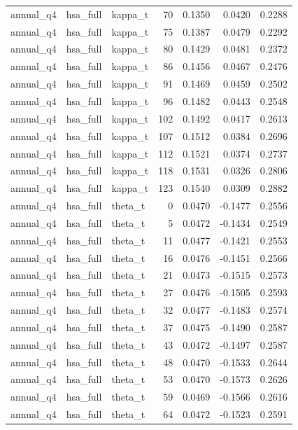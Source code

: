 \begin{tabular}{lllrrrr}
annual\_q4 & hsa\_full & kappa\_t & 70 & 0.1350 & 0.0420 & 0.2288 \\
annual\_q4 & hsa\_full & kappa\_t & 75 & 0.1387 & 0.0479 & 0.2292 \\
annual\_q4 & hsa\_full & kappa\_t & 80 & 0.1429 & 0.0481 & 0.2372 \\
annual\_q4 & hsa\_full & kappa\_t & 86 & 0.1456 & 0.0467 & 0.2476 \\
annual\_q4 & hsa\_full & kappa\_t & 91 & 0.1469 & 0.0459 & 0.2502 \\
annual\_q4 & hsa\_full & kappa\_t & 96 & 0.1482 & 0.0443 & 0.2548 \\
annual\_q4 & hsa\_full & kappa\_t & 102 & 0.1492 & 0.0417 & 0.2613 \\
annual\_q4 & hsa\_full & kappa\_t & 107 & 0.1512 & 0.0384 & 0.2696 \\
annual\_q4 & hsa\_full & kappa\_t & 112 & 0.1521 & 0.0374 & 0.2737 \\
annual\_q4 & hsa\_full & kappa\_t & 118 & 0.1531 & 0.0326 & 0.2806 \\
annual\_q4 & hsa\_full & kappa\_t & 123 & 0.1540 & 0.0309 & 0.2882 \\
annual\_q4 & hsa\_full & theta\_t & 0 & 0.0470 & -0.1477 & 0.2556 \\
annual\_q4 & hsa\_full & theta\_t & 5 & 0.0472 & -0.1434 & 0.2549 \\
annual\_q4 & hsa\_full & theta\_t & 11 & 0.0477 & -0.1421 & 0.2553 \\
annual\_q4 & hsa\_full & theta\_t & 16 & 0.0476 & -0.1451 & 0.2566 \\
annual\_q4 & hsa\_full & theta\_t & 21 & 0.0473 & -0.1515 & 0.2573 \\
annual\_q4 & hsa\_full & theta\_t & 27 & 0.0476 & -0.1505 & 0.2593 \\
annual\_q4 & hsa\_full & theta\_t & 32 & 0.0477 & -0.1483 & 0.2574 \\
annual\_q4 & hsa\_full & theta\_t & 37 & 0.0475 & -0.1490 & 0.2587 \\
annual\_q4 & hsa\_full & theta\_t & 43 & 0.0472 & -0.1497 & 0.2587 \\
annual\_q4 & hsa\_full & theta\_t & 48 & 0.0470 & -0.1533 & 0.2644 \\
annual\_q4 & hsa\_full & theta\_t & 53 & 0.0470 & -0.1573 & 0.2626 \\
annual\_q4 & hsa\_full & theta\_t & 59 & 0.0469 & -0.1566 & 0.2616 \\
annual\_q4 & hsa\_full & theta\_t & 64 & 0.0472 & -0.1523 & 0.2591 \\

\end{tabular}
